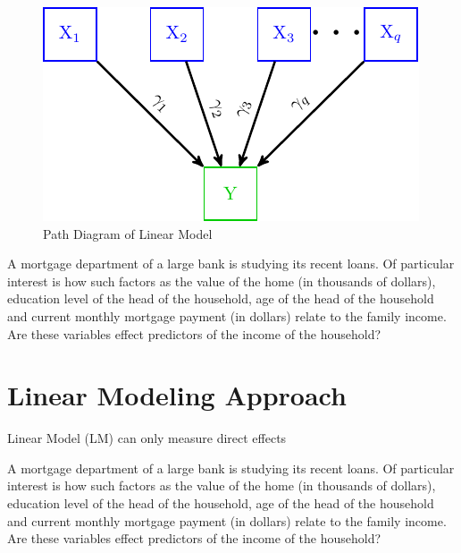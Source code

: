 \begin{figure}[H]

{\centering \includegraphics[width=0.8\linewidth]{images/LM1} 

}

\caption{Path Diagram of Linear Model}\label{fig:LM1}
\end{figure}

\begin{example}
A mortgage department of a large bank is studying its recent loans. Of particular interest is how such factors as the value of the home (in thousands of dollars), education level of the head of the household, age of the head of the household and current monthly mortgage payment (in dollars) relate to the family income. Are these variables effect predictors of the income of the household?
\end{example}

\hypertarget{linear-modeling-approach}{%
\section{Linear Modeling Approach}\label{linear-modeling-approach}}

Linear Model (LM) can only measure direct effects

\begin{example}
A mortgage department of a large bank is studying its recent loans. Of particular interest is how such factors as the value of the home (in thousands of dollars), education level of the head of the household, age of the head of the household and current monthly mortgage payment (in dollars) relate to the family income. Are these variables effect predictors of the income of the household?
\end{example}

